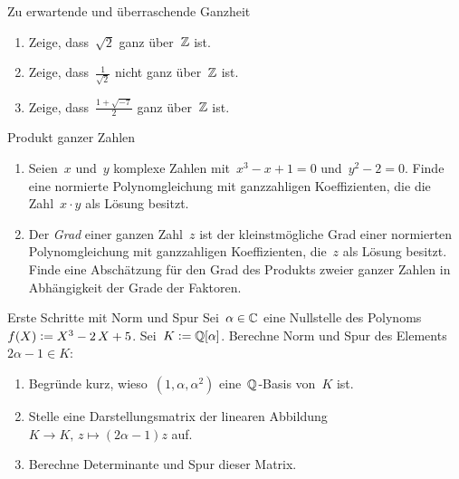 \documentclass{uebblatt}
\begin{document}

\begin{aufgabe}{Zu erwartende und überraschende Ganzheit}
\begin{enumerate}
\item Zeige, dass~$\sqrt{2}$ ganz über~$\mathbb{Z}$ ist.
\item Zeige, dass~$\tfrac{1}{\sqrt{2}}$ nicht ganz über~$\mathbb{Z}$ ist.
\item Zeige, dass~$\tfrac{1+\sqrt{-7}}{2}$ ganz über~$\mathbb{Z}$ ist.
\end{enumerate}
\end{aufgabe}

\begin{aufgabe}{Produkt ganzer Zahlen}
\begin{enumerate}
\item Seien~$x$ und~$y$ komplexe Zahlen mit~$x^3-x+1=0$ und~$y^2-2=0$.
Finde eine normierte Polynomgleichung mit ganzzahligen
Koeffizienten, die die Zahl~$x \cdot y$ als Lösung besitzt.
\item Der \emph{Grad} einer ganzen Zahl~$z$ ist der kleinstmögliche Grad
einer normierten Polynomgleichung mit ganzzahligen Koeffizienten, die~$z$ als Lösung
besitzt. Finde eine Abschätzung für den Grad des Produkts zweier ganzer Zahlen
in Abhängigkeit der Grade der Faktoren.
\end{enumerate}
\end{aufgabe}

\begin{aufgabe}{Erste Schritte mit Norm und Spur}
Sei~$\alpha \in \mathbb{C}$ eine Nullstelle des Polynoms~$f(X) \vcentcolon= X^3 - 2\,X + 5$.
Sei~$K \vcentcolon= \mathbb{Q}[\alpha]$. Berechne Norm und Spur des Elements~$2\alpha - 1
\in K$:
\begin{enumerate}
\item Begründe kurz, wieso~$(1,\alpha,\alpha^2)$ eine~$\mathbb{Q}$-Basis von~$K$ ist.
\item Stelle eine Darstellungsmatrix der linearen Abbildung~$K \to K,\,z \mapsto
(2\alpha-1)z$ auf.
\item Berechne Determinante und Spur dieser Matrix.
\end{enumerate}
\end{aufgabe}
\end{document}
